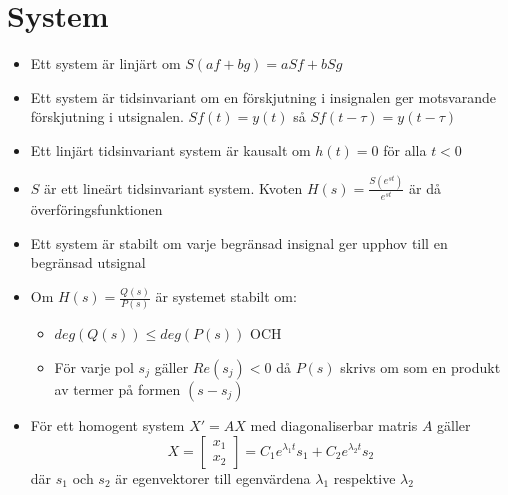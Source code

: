 \documentclass[a4paper,11pt]{article}
\begin{document}
\section{System}
\begin{itemize}
\item
  Ett system är linjärt om $S(af + bg) = aSf + bSg$
\item
  Ett system är tidsinvariant om en förskjutning i insignalen ger motsvarande förskjutning i utsignalen. $Sf(t) = y(t)$ så $Sf(t - \tau ) = y(t - \tau )$
\item
  Ett linjärt tidsinvariant system är kausalt om $h(t) = 0$ för alla $t < 0$
\item
  $S$ är ett lineärt tidsinvariant system. Kvoten $H(s) = \frac{S(e^{st})}{e^{st}}$ är då överföringsfunktionen
\item
  Ett system är stabilt om varje begränsad insignal ger upphov till en begränsad utsignal
\item
  Om $H(s) = \frac{Q(s)}{P(s)}$ är systemet stabilt om:
  \begin{itemize}
    \item $deg(Q(s)) \le deg(P(s))$ OCH
    \item För varje pol $s_j$ gäller $Re(s_j) < 0$ då $P(s)$ skrivs om som en produkt av termer på formen $(s-s_j)$
  \end{itemize}
\item
  För ett homogent system $X' = AX$ med diagonaliserbar matris $A$ gäller
  \begin{equation}
    X =
    \begin{bmatrix}
      x_1 \\
      x_2
    \end{bmatrix}
    = C_1 e^{\lambda_1 t} s_1 + C_2 e^{\lambda_2 t} s_2
  \end{equation}
  där $s_1$ och $s_2$ är egenvektorer till egenvärdena $\lambda_1$ respektive $\lambda_2$
\end{itemize}
\end{document}
